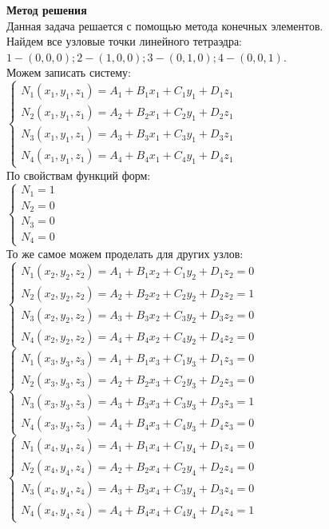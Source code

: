 \documentclass[12pt]{article}
\begin{document}
\textbf{Метод решения}\\
Данная задача решается с помощью метода конечных элементов.\\
Найдем все узловые точки линейного тетраэдра:\\
$1 - (0,0,0); 2 - (1,0,0); 3 - (0,1,0); 4 - (0,0,1).$\\
Можем записать систему:\\
$\begin{cases} N_1(x_1,y_1,z_1) = A_1 + B_1x_1 + C_1y_1 + D_1z_1\\
N_2(x_1,y_1,z_1) = A_2 + B_2x_1 + C_2y_1 + D_2z_1\\
N_3(x_1,y_1,z_1) = A_3 + B_3x_1 + C_3y_1 + D_3z_1\\
N_4(x_1,y_1,z_1) = A_4 + B_4x_1 + C_4y_1 + D_4z_1
\end{cases}$\\
По свойствам функций форм:\\
$\begin{cases} N_1 = 1\\ N_2 = 0\\ N_3 = 0\\ N_4 = 0 \end{cases}$\\
То же самое можем проделать для других узлов:\\
$\begin{cases} N_1(x_2,y_2,z_2) = A_1 + B_1x_2 + C_1y_2 + D_1z_2 = 0\\
N_2(x_2,y_2,z_2) = A_2 + B_2x_2 + C_2y_2 + D_2z_2 = 1\\
N_3(x_2,y_2,z_2) = A_3 + B_3x_2 + C_3y_2 + D_3z_2 = 0\\
N_4(x_2,y_2,z_2) = A_4 + B_4x_2 + C_4y_2 + D_4z_2 = 0
\end{cases}$\\
$\begin{cases} N_1(x_3,y_3,z_3) = A_1 + B_1x_3 + C_1y_3 + D_1z_3 = 0\\
N_2(x_3,y_3,z_3) = A_2 + B_2x_3 + C_2y_3 + D_2z_3 = 0\\
N_3(x_3,y_3,z_3) = A_3 + B_3x_3 + C_3y_3 + D_3z_3 = 1\\
N_4(x_3,y_3,z_3) = A_4 + B_4x_3 + C_4y_3 + D_4z_3 = 0
\end{cases}$\\
$\begin{cases} N_1(x_4,y_4,z_4) = A_1 + B_1x_4 + C_1y_4 + D_1z_4 = 0\\
N_2(x_4,y_4,z_4) = A_2 + B_2x_4 + C_2y_4 + D_2z_4 = 0\\
N_3(x_4,y_4,z_4) = A_3 + B_3x_4 + C_3y_4 + D_3z_4 = 0\\
N_4(x_4,y_4,z_4) = A_4 + B_4x_4 + C_4y_4 + D_4z_4 = 1
\end{cases}$\\
\end{document}
